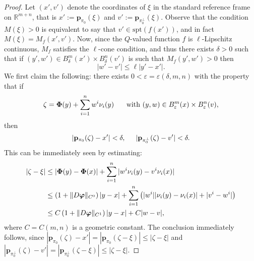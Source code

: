 \documentclass[a4paper,11pt,reqno]{amsart}
\theoremstyle{definition}
\numberwithin{equation}{section}
\numberwithin{subsection}{section}
\newcommand{\R}{\mathbb{R}}
\newcommand{\spt}{\mathrm{spt}}
\newcommand{\bphi}{\boldsymbol{\varphi}}
\newcommand{\p}{\mathbf{p}}
\begin{document}
\begin{proof}
Let $\left( x', v' \right)$ denote the coordinates of $\xi$ in the standard reference frame on $\R^{m+n}$, that is $x' := \p_{\pi_0}(\xi)$ and $v' := \p_{\pi_{0}^{\perp}}(\xi)$. Observe that the condition $M(\xi) > 0$ is equivalent to say that $v' \in \spt(f(x'))$, and in fact $M(\xi) = M_{f}(x',v')$. Now, since the $Q$-valued function $f$ is $\ell$-Lipschitz continuous, $M_f$ satisfies the $\ell$-cone condition, and thus there exists $\delta > 0$ such that if $(y',w') \in B^{m}_{\delta}(x') \times B^{n}_{\delta}(v')$ is such that $M_{f}(y',w') > 0$ then
\begin{equation} \label{vl:3}
|w' - v'| \leq \ell |y' - x'|.
\end{equation}
We first claim the following: there exists $0 < \varepsilon = \varepsilon(\delta,m,n)$ with the property that if 
\[\zeta = {\bf \Phi}(y) + \sum_{i=1}^{n} w^{i} \nu_{i}(y) \hspace{0.5cm} \mbox{ with } (y,w) \in B^{m}_{\varepsilon}(x) \times B^{n}_{\varepsilon}(v),
\]
then
\[
|\p_{\pi_{0}}(\zeta) - x'| < \delta, \hspace{0.5cm} |\p_{\pi_{0}^{\perp}}(\zeta) - v'| < \delta.
\]
This can be immediately seen by estimating:
\begin{equation} \label{vl:4}
\begin{split}
|\zeta - \xi| &\leq |{\bf \Phi}(y) - {\bf \Phi}(x)| + \sum_{i=1}^{n} |w^{i} \nu_{i}(y) - v^{i}\nu_{i}(x)| \\
&\leq \left( 1 + \|D\bphi\|_{C^0} \right) |y - x| + \sum_{i=1}^{n} \left( |w^{i}| |\nu_{i}(y) - \nu_{i}(x)| + |v^{i} - w^{i}| \right) \\
&\leq C \left( 1 + \| D\bphi \|_{C^1} \right) |y - x| + C |w - v|,
\end{split}
\end{equation}
where $C = C(m,n)$ is a geometric constant. The conclusion immediately follows, since $|\p_{\pi_{0}}(\zeta) - x'| = |\p_{\pi_{0}}(\zeta - \xi)| \leq |\zeta - \xi|$ and $|\p_{\pi_{0}^{\perp}}(\zeta) - v'| = |\p_{\pi_{0}^{\perp}}(\zeta - \xi)| \leq |\zeta - \xi|$.


\end{proof}
\end{document}
